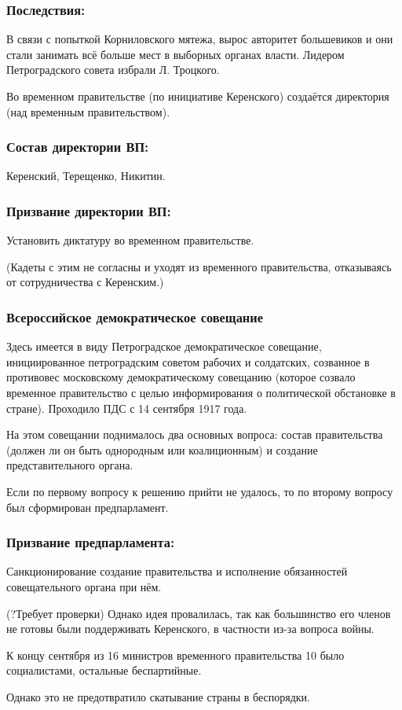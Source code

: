 \subsubsection{\textbf{Последствия:}}

В связи с попыткой Корниловского мятежа, вырос авторитет большевиков и они стали занимать всё больше мест в выборных органах власти. Лидером Петроградского совета избрали Л. Троцкого.

Во временном правительстве (по инициативе Керенского) создаётся директория (над временным правительством).

\subsubsection{\textbf{Состав директории ВП:}}

Керенский, Терещенко, Никитин.

\subsubsection{\textbf{Призвание директории ВП:}}

Установить диктатуру во временном правительстве.

(Кадеты с этим не согласны и уходят из временного правительства, отказываясь от сотрудничества с Керенским.)

\subsubsection{\textbf{Всероссийское демократическое совещание}}

Здесь имеется в виду Петроградское демократическое совещание, инициированное петроградским советом рабочих и солдатских, созванное в противовес московскому демократическому совещанию (которое созвало временное правительство с целью информирования о политической обстановке в стране). Проходило ПДС с 14 сентября 1917 года. 

На этом совещании поднималось два основных вопроса: состав правительства (должен ли он быть однородным или коалиционным) и создание представительного органа.

Если по первому вопросу к решению прийти не удалось, то по второму вопросу был сформирован предпарламент.

\subsubsection{\textbf{Призвание предпарламента:}}
 
Санкционирование создание правительства и исполнение обязанностей совещательного органа при нём.

(?Требует проверки) Однако идея провалилась, так как большинство его членов не готовы были поддерживать Керенского, в частности из-за вопроса войны.

К концу сентября из 16 министров временного правительства 10 было социалистами, остальные беспартийные.

Однако это не предотвратило скатывание страны в беспорядки.
